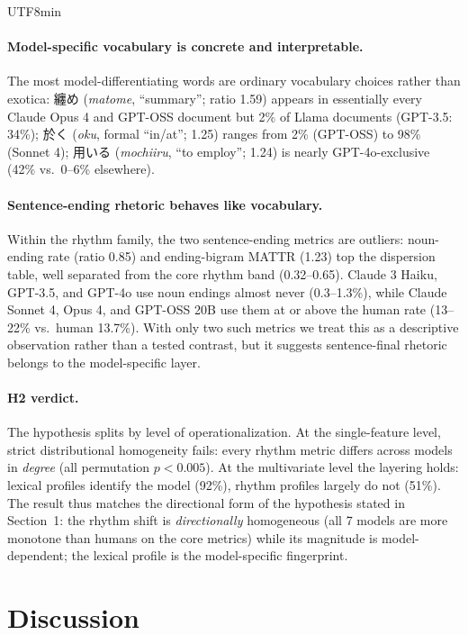 \documentclass[11pt,a4paper]{article}
\begin{document}
\begin{CJK}{UTF8}{min}
\paragraph{Model-specific vocabulary is concrete and interpretable.} The most model-differentiating words are ordinary vocabulary choices rather than exotica: 纏め (\textit{matome}, ``summary''; ratio 1.59) appears in essentially every Claude Opus 4 and GPT-OSS document but 2\% of Llama documents (GPT-3.5: 34\%); 於く (\textit{oku}, formal ``in/at''; 1.25) ranges from 2\% (GPT-OSS) to 98\% (Sonnet 4); 用いる (\textit{mochiiru}, ``to employ''; 1.24) is nearly GPT-4o-exclusive (42\% vs.\ 0--6\% elsewhere).

\paragraph{Sentence-ending rhetoric behaves like vocabulary.} Within the rhythm family, the two sentence-ending metrics are outliers: noun-ending rate (ratio 0.85) and ending-bigram MATTR (1.23) top the dispersion table, well separated from the core rhythm band (0.32--0.65). Claude 3 Haiku, GPT-3.5, and GPT-4o use noun endings almost never (0.3--1.3\%), while Claude Sonnet 4, Opus 4, and GPT-OSS 20B use them at or above the human rate (13--22\% vs.\ human 13.7\%). With only two such metrics we treat this as a descriptive observation rather than a tested contrast, but it suggests sentence-final rhetoric belongs to the model-specific layer.

\paragraph{H2 verdict.} The hypothesis splits by level of operationalization. At the single-feature level, strict distributional homogeneity fails: every rhythm metric differs across models in \emph{degree} (all permutation $p<0.005$). At the multivariate level the layering holds: lexical profiles identify the model (92\%), rhythm profiles largely do not (51\%). The result thus matches the directional form of the hypothesis stated in Section~1: the rhythm shift is \emph{directionally} homogeneous (all 7 models are more monotone than humans on the core metrics) while its magnitude is model-dependent; the lexical profile is the model-specific fingerprint.

\section{Discussion}


\end{CJK}
\end{document}
